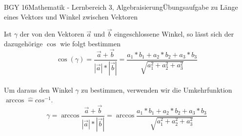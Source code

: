 \documentclass[oneside,openany,headings=optiontotoc,11pt,numbers=noenddot]{scrreprt}
\begin{document}
\begin{worksheet}{BGY 16}{Mathematik - Lernbereich 3, Algebraisierung}{Übungsaufgabe zu Länge eines Vektors und Winkel zwischen Vektoren}
\begin{framed}
			\raggedright
			Ist \(\gamma\) der von den Vektoren \(\vec{a}\) und \(\vec{b}\) eingeschlossene Winkel, so lässt sich der dazugehörige \(\cos\) wie folgt bestimmen
			\[\cos(\gamma) = \frac{\vec{a}+\vec{b}}{|\vec{a}|*|\vec{b}|} = \frac{a_1*b_1 + a_2*b_2 + a_3*b_3}{\sqrt{a_1^2 + a_2^2 + a_3^2}}\]\\
			Um daraus den Winkel \(\gamma\) zu bestimmen, verwenden wir die Umkehrfunktion \(\arccos \widehat{=}cos^{-1}\).
			\[\gamma = \arccos{\frac{\vec{a}+\vec{b}}{|\vec{a}|*|\vec{b}|}} = \arccos{\frac{a_1*b_1 + a_2*b_2 + a_3*b_3}{\sqrt{a_1^2 + a_2^2 + a_3^2}}}\]
		\end{framed}
	\end{worksheet}
\end{document}
